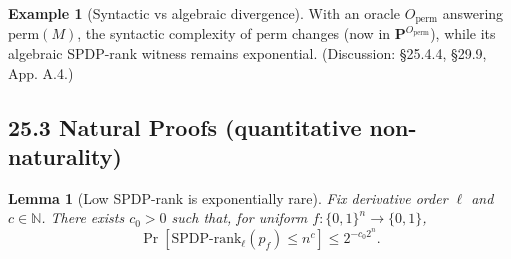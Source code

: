 \documentclass[12pt]{article}
\newtheorem{lemma}[theorem]{Lemma}
\theoremstyle{definition}
\theoremstyle{definition}
\newtheorem{example}{Example}
\theoremstyle{remark}
\theoremstyle{remark}
\begin{document}
\begin{example}[Syntactic vs algebraic divergence]
With an oracle $O_{\text{perm}}$ answering $\text{perm}(M)$, the syntactic complexity of $\text{perm}$ changes (now in $\mathbf{P}^{O_{\text{perm}}}$), while its algebraic SPDP-rank witness remains exponential. (Discussion: \S25.4.4, \S29.9, App. A.4.)
\end{example}

\subsection{25.3 Natural Proofs (quantitative non-naturality)}

\begin{lemma}[Low SPDP-rank is exponentially rare]\label{lem:low-rank-rare}
Fix derivative order $\ell$ and $c \in \mathbb{N}$. There exists $c_0 > 0$ such that, for uniform $f : \{0,1\}^n \to \{0,1\}$,
\[
\Pr[\text{SPDP-rank}_\ell(p_f) \leq n^c] \leq 2^{-c_0 2^n}.
\]
\end{lemma}
\end{document}
